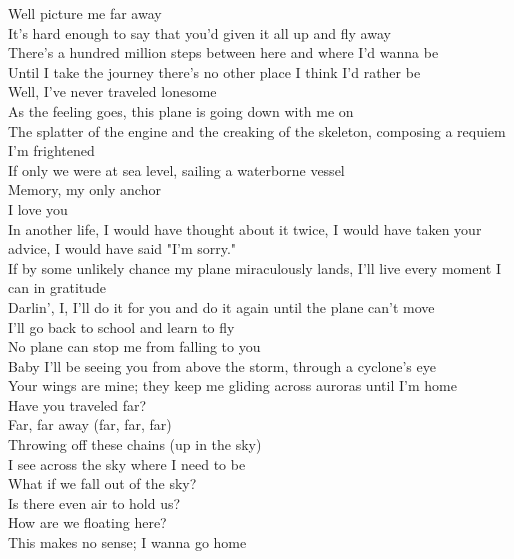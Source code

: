 Well picture me far away \\
It's hard enough to say that you'd given it all up and fly away \\
There's a hundred million steps between here and where I'd wanna be \\
Until I take the journey there's no other place I think I'd rather be \\

Well, I've never traveled lonesome \\
As the feeling goes, this plane is going down with me on \\

The splatter of the engine and the creaking of the skeleton, composing a requiem \\
I'm frightened \\
If only we were at sea level, sailing a waterborne vessel \\
Memory, my only anchor \\
I love you \\
In another life, I would have thought about it twice, I would have taken your advice, I would have said "I'm sorry." \\
If by some unlikely chance my plane miraculously lands, I'll live every moment I can in gratitude \\

Darlin', I, I'll do it for you and do it again until the plane can't move \\
I'll go back to school and learn to fly \\
No plane can stop me from falling to you \\
Baby I'll be seeing you from above the storm, through a cyclone's eye \\
Your wings are mine; they keep me gliding across auroras until I'm home \\

Have you traveled far? \\
Far, far away (far, far, far) \\
Throwing off these chains (up in the sky) \\
I see across the sky where I need to be \\

What if we fall out of the sky? \\
Is there even air to hold us? \\
How are we floating here? \\
This makes no sense; I wanna go home \\

